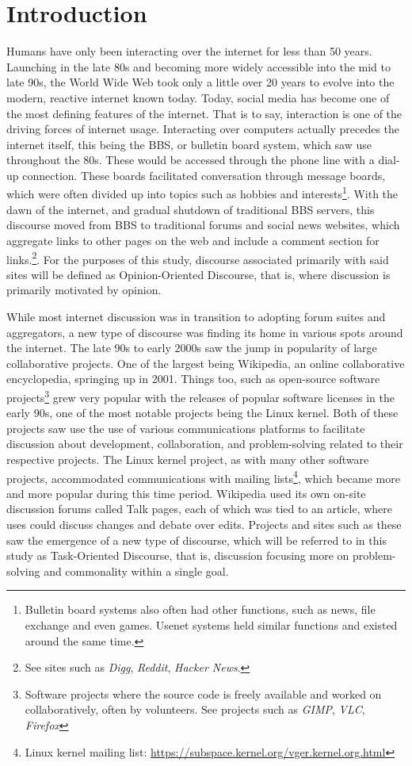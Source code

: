 \documentclass{article}
\begin{document}
\section{Introduction}
Humans have only been interacting over the internet for less than 50 years. Launching in the late 80s and becoming more widely accessible into the mid to late 90s, the World Wide Web took only a little over 20 years to evolve into the modern, reactive internet known today. Today, social media has become one of the most defining features of the internet. That is to say, interaction is one of the driving forces of internet usage. Interacting over computers actually precedes the internet itself, this being the BBS, or bulletin board system, which saw use throughout the 80s. These would be accessed through the phone line with a dial-up connection. These boards facilitated conversation through message boards, which were often divided up into topics such as hobbies and interests\footnote{Bulletin board systems also often had other functions, such as news, file exchange and even games. Usenet systems held similar functions and existed around the same time.}. With the dawn of the internet, and gradual shutdown of traditional BBS servers, this discourse moved from BBS to traditional forums and social news websites, which aggregate links to other pages on the web and include a comment section for links.\footnote{See sites such as \textit{Digg}, \textit{Reddit}, \textit{Hacker News}.}. For the purposes of this study, discourse associated primarily with said sites will be defined as Opinion-Oriented Discourse, that is, where discussion is primarily motivated by opinion.

While most internet discussion was in transition to adopting forum suites and aggregators, a new type of discourse was finding its home in various spots around the internet. The late 90s to early 2000s saw the jump in popularity of large collaborative projects. One of the largest being Wikipedia, an online collaborative encyclopedia, springing up in 2001. Things too, such as open-source software projects\footnote{Software projects where the source code is freely available and worked on collaboratively, often by volunteers. See projects such as \textit{GIMP}, \textit{VLC}, \textit{Firefox}} grew very popular with the releases of popular software licenses in the early 90s, one of the most notable projects being the Linux kernel. Both of these projects saw use the use of various communications platforms to facilitate discussion about development, collaboration, and problem-solving related to their respective projects. The Linux kernel project, as with many other software projects, accommodated communications with mailing lists\footnote{Linux kernel mailing list: \url{https://subspace.kernel.org/vger.kernel.org.html}}, which became more and more popular during this time period. Wikipedia used its own on-site discussion forums called Talk pages, each of which was tied to an article, where uses could discuss changes and debate over edits. Projects and sites such as these saw the emergence of a new type of discourse, which will be referred to in this study as Task-Oriented Discourse, that is, discussion focusing more on problem-solving and commonality within a single goal.
\end{document}
